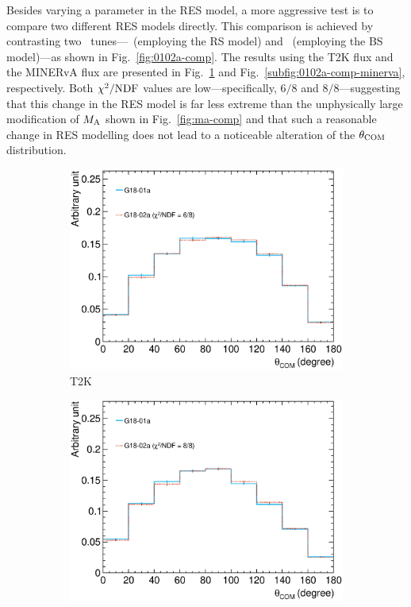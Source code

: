      Besides varying a parameter in the RES model, a more aggressive test is to compare two different RES models directly.
     This comparison is achieved by contrasting two \genie\ tunes—\geoa\ (employing the RS model) and \getwoa\ (employing the BS model)—as shown in Fig.~\ref{fig:0102a-comp}.
     The results using the T2K flux and the MINERvA flux are presented in Fig.~\ref{subfig:0102a-comp-t2k} and Fig.~\ref{subfig:0102a-comp-minerva}, respectively.
     Both $\chi^2/{\textrm{NDF}}$ values are low—specifically, $6/8$ and $8/8$—suggesting that this change in the RES model is far less extreme than the unphysically large modification of $M_{\textrm{A}}$ shown in Fig.~\ref{fig:ma-comp} and that such a reasonable change in RES modelling does not lead to a noticeable alteration of the $\theta_{\textrm{COM}}$ distribution.
     \begin{figure}
     \centering
     \begin{subfigure}[b]{\dbfigwid\textwidth}
          \centering
          \includegraphics[width=\textwidth]{figures/COM/anorm-01a-02a_da_tan.eps}
          \caption{T2K}
          \label{subfig:0102a-comp-t2k}
     \end{subfigure}
     \begin{subfigure}[b]{\dbfigwid\textwidth}
          \centering
          \includegraphics[width=\textwidth]{figures/COM/anorm-01a-02a-minerva_da_tan.eps}

\end{subfigure}
\end{figure}
